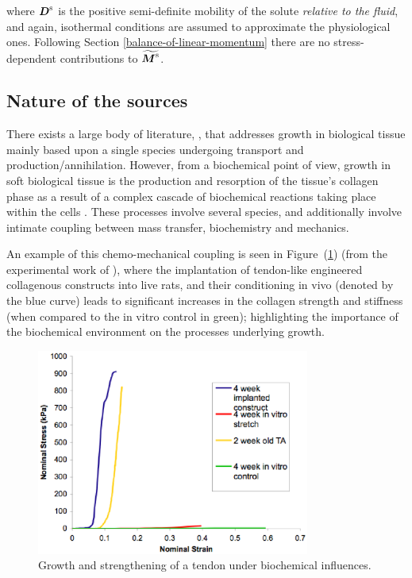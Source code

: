 \noindent where $\mbox{\boldmath$ D$}^\mathrm{s}$ is the positive semi-definite
mobility of the solute {\em relative to the fluid}, and again,
isothermal conditions are assumed to approximate the physiological
ones. Following Section \ref{balance-of-linear-momentum} there are no
stress-dependent contributions to $\widetilde{\mbox{\boldmath$ M$}^\mathrm{s}}$.

\subsection{Nature of the sources}
\label{nature-of-sources}

There exists a large body of literature, \citep{CowinHegedus:76,
  EpsteinMaugin:2000, AmbrosiMollica:2002}, that addresses growth in
biological tissue mainly based upon a single species undergoing
transport and production/annihilation. However, from a biochemical
point of view, growth in soft biological tissue is the production and
resorption of the tissue's collagen phase as a result of a complex
cascade of biochemical reactions taking place within the cells
\citep{Alberts:02}. These processes involve several species, and
additionally involve intimate coupling between mass transfer,
biochemistry and mechanics.

An example of this chemo-mechanical coupling is seen in
Figure~(\ref{implantation-strengthening}) (from the experimental work
of \citet{calveetal:07}), where the implantation of tendon-like
engineered collagenous constructs into live rats, and their
conditioning in vivo (denoted by the blue curve) leads to significant
increases in the collagen strength and stiffness (when compared to the
in vitro control in green); highlighting the importance of the
biochemical environment on the processes underlying growth.

\begin{figure}
  \centering
  \includegraphics[width=0.8\textwidth]{images/experiments/implantation-strengthening}
  \caption{Growth and strengthening of a tendon under biochemical
    influences.}
  \label{implantation-strengthening}
\end{figure}


